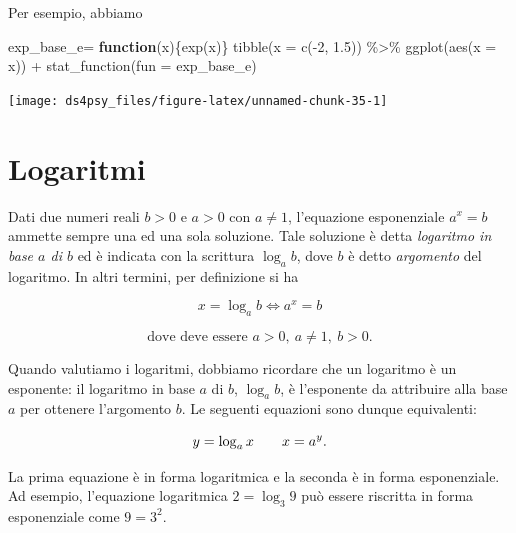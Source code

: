 \documentclass[
  11pt,
]{krantz}
\makeatletter
\newenvironment{Shaded}{\begin{snugshade}}{\end{snugshade}}
\newcommand{\AttributeTok}[1]{\textcolor[rgb]{0.61,0.61,0.61}{#1}}
\newcommand{\ControlFlowTok}[1]{\textcolor[rgb]{0.27,0.27,0.27}{\textbf{#1}}}
\newcommand{\DecValTok}[1]{\textcolor[rgb]{0.06,0.06,0.06}{#1}}
\newcommand{\FloatTok}[1]{\textcolor[rgb]{0.06,0.06,0.06}{#1}}
\newcommand{\FunctionTok}[1]{\textcolor[rgb]{0,0,0}{#1}}
\newcommand{\NormalTok}[1]{#1}
\newcommand{\OtherTok}[1]{\textcolor[rgb]{0.37,0.37,0.37}{#1}}
\newcommand{\SpecialCharTok}[1]{\textcolor[rgb]{0,0,0}{#1}}
\newenvironment{kframe}{%
\medskip{}
\setlength{\fboxsep}{.8em}
 \def\at@end@of@kframe{}%
 \ifinner\ifhmode%
  \def\at@end@of@kframe{\end{minipage}}%
  \begin{minipage}{\columnwidth}%
 \fi\fi%
 \def\FrameCommand##1{\hskip\@totalleftmargin \hskip-\fboxsep
 \colorbox{shadecolor}{##1}\hskip-\fboxsep
     \hskip-\linewidth \hskip-\@totalleftmargin \hskip\columnwidth}%
 \MakeFramed {\advance\hsize-\width
   \@totalleftmargin\z@ \linewidth\hsize
   \@setminipage}}%
 {\par\unskip\endMakeFramed%
 \at@end@of@kframe}
\renewenvironment{Shaded}{\begin{kframe}}{\end{kframe}}
\theoremstyle{definition}
\theoremstyle{definition}
\theoremstyle{definition}
\theoremstyle{definition}
\theoremstyle{remark}
\makeatother
\begin{document}
Per esempio, abbiamo

\begin{Shaded}
\begin{Highlighting}[]
\NormalTok{exp\_base\_e}\OtherTok{=} \ControlFlowTok{function}\NormalTok{(x)\{}\FunctionTok{exp}\NormalTok{(x)\}}
\FunctionTok{tibble}\NormalTok{(}\AttributeTok{x =} \FunctionTok{c}\NormalTok{(}\SpecialCharTok{{-}}\DecValTok{2}\NormalTok{, }\FloatTok{1.5}\NormalTok{)) }\SpecialCharTok{\%\textgreater{}\%}
\FunctionTok{ggplot}\NormalTok{(}\FunctionTok{aes}\NormalTok{(}\AttributeTok{x =}\NormalTok{ x)) }\SpecialCharTok{+}
  \FunctionTok{stat\_function}\NormalTok{(}\AttributeTok{fun =}\NormalTok{ exp\_base\_e)}
\end{Highlighting}
\end{Shaded}

\begin{center}\texttt{[image: ds4psy\_files/figure-latex/unnamed-chunk-35-1]} \end{center}

\hypertarget{logaritmi}{%
\section*{Logaritmi}\label{logaritmi}}


Dati due numeri reali \(b > 0\) e \(a > 0\) con \(a \neq 1\), l'equazione esponenziale \(a^x = b\) ammette sempre una ed una sola soluzione. Tale soluzione è detta \emph{logaritmo in base \(a\) di \(b\)} ed è indicata con la scrittura \(\log_a b\), dove \(b\) è detto \emph{argomento} del logaritmo. In altri termini, per definizione si ha

\[
x = \log_a b \Longleftrightarrow a^x = b
\]

\[
\text{dove deve essere } a > 0, \ a \neq 1,\ b > 0.
\]

Quando valutiamo i logaritmi, dobbiamo ricordare che un logaritmo è un esponente: il logaritmo in base \(a\) di \(b\), \(\log_a b\), è l'esponente da attribuire alla base \(a\) per ottenere l'argomento \(b\). Le seguenti equazioni sono dunque equivalenti:

\begin{equation}
y = \log_a x \qquad x = a^y.\notag
\end{equation}

La prima equazione è in forma logaritmica e la seconda è in forma esponenziale. Ad esempio, l'equazione logaritmica \(2 = \log_3 9\) può essere riscritta in forma esponenziale come \(9 = 3^2\).
\end{document}

